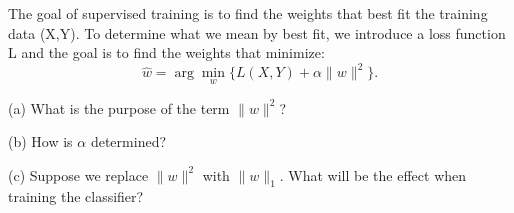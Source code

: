 The goal of supervised training is to find the weights that best fit the training data (X,Y). To determine what we mean by best fit, we introduce a loss function L and the goal is to find the weights that minimize:
\[
\hat w=\arg\min_w\{L(X,Y)+\alpha\|w\|^2\}.
\]


(a) What is the purpose of the term \(\|w\|^2\)?


(b) How is \ensuremath{\alpha} determined?


(c) Suppose we replace \(\|w\|^2\) with \(\|w\|_1\). What will be the effect when training the classifier?
